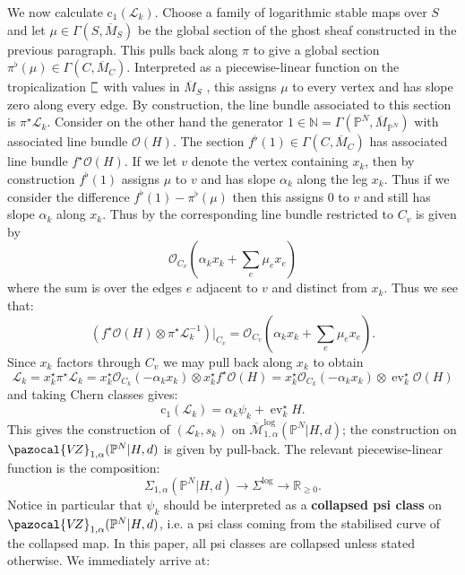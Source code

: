 \documentclass[11pt]{amsart}
\newcommand{\sqC}{\scalebox{0.8}[1.3]{$\sqsubset$}}
\newcommand{\MLog}{\overline{\mathcal{M}}^{\operatorname{log}}}
\newcommand{\PP}{\mathbb P}
\newcommand{\VZ}{\pazocal{V\!Z}}
\newcommand{\st}{\star}
\newcommand{\N}{\mathbb{N}}
\newcommand{\OO}{\mathcal{O}}
\renewcommand{\to}{\rightarrow}
\newcommand{\ev}{\operatorname{ev}}
\newcommand{\Lcal}{\mathcal{L}}
\newcommand{\cchern}{\mathrm{c}}
\newcommand{\ol}[1]{\overline{#1}}
\newcommand{\RR}{\mathbb{R}}
\theoremstyle{definition}
\theoremstyle{definition}
\begin{document}
We now calculate $\cchern_1(\Lcal_k)$. Choose a family of logarithmic stable maps over $S$ and let $\mu \in \Gamma(S,\ol{M}_S)$ be the global section of the ghost sheaf constructed in the previous paragraph. This pulls back along $\pi$ to give a global section $\pi^\flat(\mu) \in \Gamma(C,\ol{M}_C)$.  Interpreted as a piecewise-linear function on the tropicalization $\sqC$ with values in $\ol{M}_S$ \cite[Remark 7.3]{CavalieriChanUlirschWise}, this assigns $\mu$ to every vertex and has slope zero along every edge. By construction, the line bundle associated to this section is $\pi^\st \Lcal_k$. Consider on the other hand the generator $1 \in \N = \Gamma(\PP^N,\ol{M}_{\PP^N})$ with associated line bundle $\OO(H)$. The section $f^\flat(1) \in \Gamma(C,\ol{M}_C)$ has associated line bundle $f^\st\OO(H)$. If we let $v$ denote the vertex containing $x_k$, then by construction $f^\flat(1)$ assigns $\mu$ to $v$ and has slope $\alpha_k$ along the leg $x_k$. Thus if we consider the difference $f^\flat(1) - \pi^\flat(\mu)$ then this assigns $0$ to $v$ and still has slope $\alpha_k$ along $x_k$. Thus by \cite[Proposition 2.4.1]{RSPW} the corresponding line bundle restricted to $C_v$ is given by
\begin{equation*} \OO_{C_v} \left(\alpha_k x_k + \sum_e \mu_e x_e \right) \end{equation*}
where the sum is over the edges $e$ adjacent to $v$ and distinct from $x_k$. Thus we see that:
\begin{equation*} \left( f^\st\OO(H) \otimes \pi^\st \Lcal_k^{-1} \right) \big|_{C_v} = \OO_{C_v} \left(\alpha_k x_k + \sum_e \mu_e x_e \right).\end{equation*}
Since $x_k$ factors through $C_v$ we may pull back along $x_k$ to obtain
\begin{equation*} \Lcal_k = x_k^\st\pi^\st \Lcal_k = x_k^\st \OO_{C_k}(-\alpha_k x_k) \otimes x_k^\st f^\st\OO(H) = x_k^\st \OO_{C_k}(-\alpha_k x_k) \otimes \ev_k^\st \OO(H) \end{equation*}
and taking Chern classes gives:
\begin{equation*} \cchern_1(\Lcal_k) = \alpha_k \psi_k + \ev_k^\st H.\end{equation*}
This gives the construction of $(\Lcal_k,s_k)$ on $\MLog_{1,\alpha}(\PP^N|H,d)$; the construction on $\VZ_{1,\alpha}(\PP^N|H,d)$ is given by pull-back. The relevant piecewise-linear function is the composition:
\begin{equation*} \Sigma_{1,\alpha}(\PP^N|H,d) \to \Sigma^{\log} \to \RR_{\geq 0}.\end{equation*}
Notice in particular that $\psi_k$ should be interpreted as a \textbf{collapsed psi class} on $\VZ_{1,\alpha}(\PP^N|H,d)$, i.e. a psi class coming from the stabilised curve of the collapsed map. In this paper, all psi classes are collapsed unless stated otherwise. We immediately arrive at:
\end{document}
